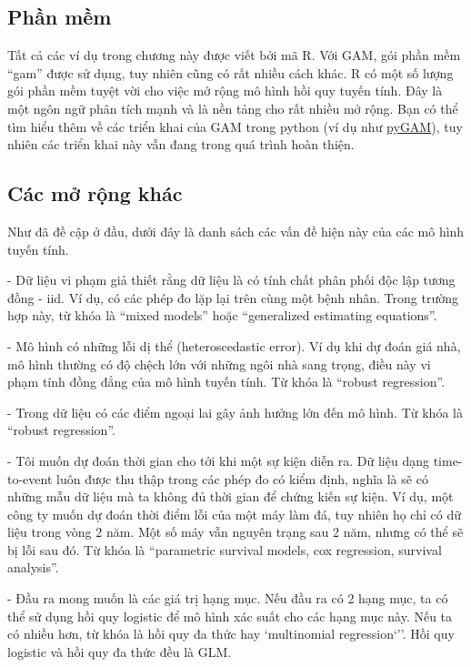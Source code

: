 \clearpage

\subsection{Phần mềm}
Tất cả các ví dụ trong chương này được viết bởi mã R. Với GAM, gói phần mềm ``gam'' được sử dụng, tuy nhiên cũng có rất nhiều cách khác. R có một số lượng gói phần mềm tuyệt vời cho việc mở rộng mô hình hồi quy tuyến tính. Đây là một ngôn ngữ phân tích mạnh và là nền tảng cho rất nhiều mở rộng. Bạn có thể tìm hiểu thêm về các triển khai của GAM trong python (ví dụ như \href{https://github.com/dswah/pyGAM}{pyGAM}), tuy nhiên các triển khai này vẫn đang trong quá trình hoàn thiện.

\subsection{Các mở rộng khác}
Như đã đề cập ở đầu, dưới đây là danh sách các vấn đề hiện này của các mô hình tuyến tính.

- Dữ liệu vi phạm giả thiết rằng dữ liệu là có tính chất phân phối độc lập tương đồng - iid. Ví dụ, có các phép đo lặp lại trên cùng một bệnh nhân. Trong trường hợp này, từ khóa là ``mixed models'' hoặc ``generalized estimating equations''.

- Mô hình có những lỗi dị thể (heteroscedastic error). Ví dụ khi dự đoán giá nhà, mô hình thường có độ chệch lớn với những ngôi nhà sang trọng, điều này vi phạm tính đồng đẳng của mô hình tuyến tính. Từ khóa là ``robust regression''.

- Trong dữ liệu có các điểm ngoại lai gây ảnh hưởng lớn đến mô hình. Từ khóa là ``robust regression''.

- Tôi muốn dự đoán thời gian cho tới khi một sự kiện diễn ra. Dữ liệu dạng time-to-event luôn được thu thập trong các phép đo có kiểm định, nghĩa là sẽ có những mẫu dữ liệu mà ta không đủ thời gian để chứng kiến sự kiện. Ví dụ, một công ty muốn dự đoán thời điểm lỗi của một máy làm đá, tuy nhiên họ chỉ có dữ liệu trong vòng 2 năm. Một số máy vẫn nguyên trạng sau 2 năm, nhưng có thể sẽ bị lỗi sau đó. Từ khóa là ``parametric survival models, cox regression, survival analysis''.

- Đầu ra mong muốn là các giá trị hạng mục. Nếu đầu ra có 2 hạng mục, ta có thể sử dụng hồi quy logistic để mô hình xác suất cho các hạng mục này. Nếu ta có nhiều hơn, từ khóa là hồi quy đa thức hay  `multinomial regression`''. Hồi quy logistic và hồi quy đa thức đều là GLM.

